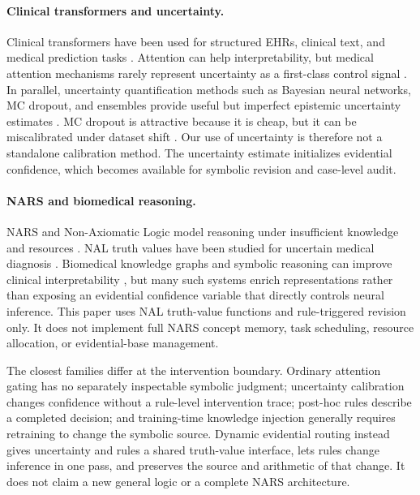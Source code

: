 \documentclass[final]{nesy2026}
\begin{document}
\paragraph{Clinical transformers and uncertainty.}
Clinical transformers have been used for structured EHRs, clinical text, and medical prediction tasks \citep{rasmy2021,li2019,dai2025}. Attention can help interpretability, but medical attention mechanisms rarely represent uncertainty as a first-class control signal \citep{goncalves2022}. In parallel, uncertainty quantification methods such as Bayesian neural networks, MC dropout, and ensembles provide useful but imperfect epistemic uncertainty estimates \citep{blundell2015,gal2016,lakshminarayanan2017,abad2025}. MC dropout is attractive because it is cheap, but it can be miscalibrated under dataset shift \citep{ovadia2019}. Our use of uncertainty is therefore not a standalone calibration method. The uncertainty estimate initializes evidential confidence, which becomes available for symbolic revision and case-level audit.

\paragraph{NARS and biomedical reasoning.}
NARS and Non-Axiomatic Logic model reasoning under insufficient knowledge and resources \citep{wang1995,wang2006,wang2022}. NAL truth values have been studied for uncertain medical diagnosis \citep{wang2013}. Biomedical knowledge graphs and symbolic reasoning can improve clinical interpretability \citep{wu2023,abusalih2023,rajabi2022,jiang2024,chudasama2025}, but many such systems enrich representations rather than exposing an evidential confidence variable that directly controls neural inference. This paper uses NAL truth-value functions and rule-triggered revision only. It does not implement full NARS concept memory, task scheduling, resource allocation, or evidential-base management.

The closest families differ at the intervention boundary. Ordinary attention gating has no separately inspectable symbolic judgment; uncertainty calibration changes confidence without a rule-level intervention trace; post-hoc rules describe a completed decision; and training-time knowledge injection generally requires retraining to change the symbolic source. Dynamic evidential routing instead gives uncertainty and rules a shared truth-value interface, lets rules change inference in one pass, and preserves the source and arithmetic of that change. It does not claim a new general logic or a complete NARS architecture.
\end{document}
